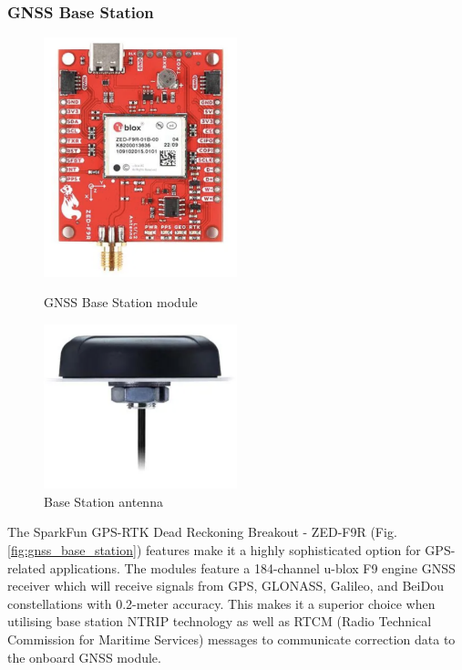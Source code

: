 \documentclass{article}
\begin{document}
\subsubsection{GNSS Base Station}
\begin{figure}[H]
  \begin{minipage}{0.5\textwidth}
    \centering
    \includegraphics[width=0.5\textwidth]{Pictures/gnss_base_station.png}
    \caption{GNSS Base Station module}
    \label{fig:gnss_base_station}
  \end{minipage}
  \begin{minipage}{0.5\textwidth}
    \centering
    \includegraphics[width=0.5\textwidth]{Pictures/base_station_antenna.png}
    \caption{Base Station antenna}
    \label{fig:base_station_antenna}
  \end{minipage}
\end{figure}
The SparkFun GPS-RTK Dead Reckoning Breakout - ZED-F9R (Fig.\ref{fig:gnss_base_station}) features make it a highly sophisticated option for GPS-related applications. The modules feature a 184-channel u-blox F9 engine GNSS receiver which will receive signals from GPS, GLONASS, Galileo, and BeiDou 
constellations with 0.2-meter accuracy. This makes it a superior choice when utilising base station NTRIP technology as well as RTCM (Radio Technical Commission for Maritime Services) messages to communicate correction data to the onboard GNSS module.
\end{document}
